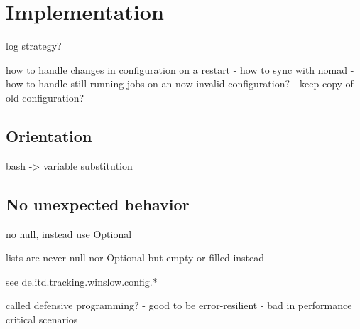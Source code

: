 \chapter{Implementation}

log strategy?

how to handle changes in configuration on a restart
 - how to sync with nomad
 - how to handle still running jobs on an now invalid configuration?
    - keep copy of old configuration?

\section{Orientation}

bash -> variable substitution

\section{No unexpected behavior}

no null, instead use Optional

lists are never null nor Optional but empty or filled instead

see de.itd.tracking.winslow.config.*

called defensive programming?
  - good to be error-resilient
  - bad in performance critical scenarios
  
